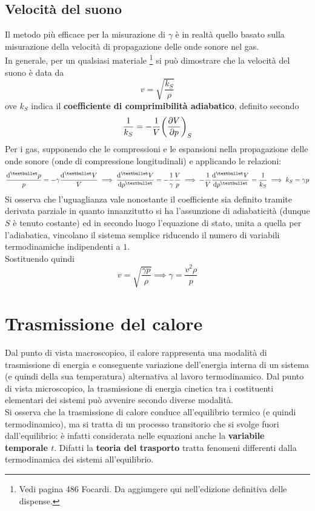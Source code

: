 \documentclass[10pt, oneside]{book}
\begin{document}
\section{Velocità del suono}
Il metodo più efficace per la misurazione di $\gamma$ è in realtà quello basato sulla misurazione della velocità di propagazione delle onde sonore nel gas.\\
In generale, per un qualsiasi materiale \footnote{Vedi pagina 486 Focardi. Da aggiungere qui nell'edizione definitiva delle dispense.} si può dimostrare che la velocità del suono è data da
\[v = \sqrt{\frac{k_S}{\rho}}\]
ove $k_S$ indica il \textbf{coefficiente di comprimibilità adiabatico}, definito secondo
\[\frac{1}{k_S} = - \frac{1}{V} \bigg(\pdv{V}{p}\bigg)_S\]
Per i gas, supponendo che le compressioni e le espansioni nella propagazione delle onde sonore (onde di compressione longitudinali) e applicando le relazioni:
\[\frac{\dd[•]{p}}{p} = - \gamma \frac{\dd[•]{V}}{V} \implies \dv[•]{V}{p} = - \frac{1}{\gamma} \frac{V}{p} \implies - \frac{1}{V} \dv[•]{V}{p} = \frac{1}{k_S} \implies k_S = \gamma p\]
Si osserva che l'uguaglianza vale nonostante il coefficiente sia definito tramite derivata parziale in quanto innanzitutto si ha l'assunzione di adiabaticità (dunque $S$ è tenuto costante) ed in secondo luogo l'equazione di stato, unita a quella per l'adiabatica, vincolano il sistema semplice riducendo il numero di variabili termodinamiche indipendenti a $1$. \\
Sostituendo quindi
\[v = \sqrt{\frac{\gamma p}{\rho}} \implies \gamma = \frac{v^2 \rho}{p}\]

\chapter{Trasmissione del calore}
Dal punto di vista macroscopico, il calore rappresenta una modalità di trasmissione di energia e conseguente variazione dell'energia interna di un sistema (e quindi della sua temperatura) alternativa al lavoro termodinamico. Dal punto di vista microscopico, la trasmissione di energia cinetica tra i costituenti elementari dei sistemi può avvenire secondo diverse modalità.\\
Si osserva che la trasmissione di calore conduce all'equilibrio termico (e quindi termodinamico), ma si tratta di un processo transitorio che si svolge fuori dall'equilibrio: è infatti considerata nelle equazioni anche la \textbf{variabile temporale $t$}. Difatti la \textbf{teoria del trasporto} tratta fenomeni differenti dalla termodinamica dei sistemi all'equilibrio.
\end{document}
